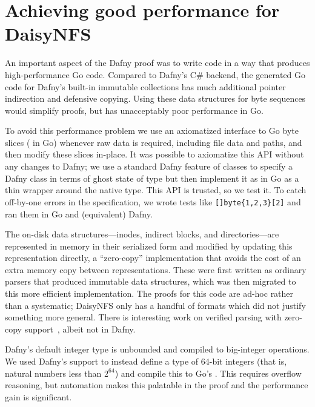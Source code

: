 
\section{Achieving good performance for DaisyNFS}
\label{sec:impl:dafny-perf}

An important aspect of the Dafny proof was to write code in a way that produces
high-performance Go code.
Compared to Dafny's C\# backend, the generated Go code for Dafny's built-in
immutable collections has much
additional pointer indirection and defensive copying. Using these data
structures for byte sequences would simplify proofs, but has unacceptably poor
performance in Go.

To avoid this performance problem we use an axiomatized interface to
Go byte slices ( in Go) whenever raw data is required, including file
data and paths, and then modify these slices in-place. It was possible to
axiomatize this API without any changes to Dafny; we use a standard Dafny
feature of  classes to specify a Dafny class  in terms of
ghost state of type  but then implement it as in Go as a thin
wrapper around the native  type. This API is trusted, so we
test it. To catch off-by-one errors in the specification, we wrote
tests like \verb![]byte{1,2,3}[2]! and ran them in Go and
(equivalent) Dafny.

The on-disk data structures---inodes, indirect blocks, and directories---are
represented in memory in their serialized form and modified by updating this
representation directly, a ``zero-copy'' implementation that avoids the cost of
an extra memory copy between representations. These were first written as
ordinary parsers that produced immutable data structures, which was then
migrated to this more efficient implementation. The proofs for this code are
ad-hoc rather than a systematic; DaisyNFS only has a handful of formats which
did not justify something more general. There is interesting work on
verified parsing with zero-copy support~\cite{swamy:everparse3d}, albeit not in Dafny.

Dafny's default integer type  is unbounded and compiled to big-integer
operations. We used Dafny's
 support to instead define a type of 64-bit integers (that
is, natural numbers less than $2^{64}$) and compile this to Go's .
This requires overflow reasoning, but
automation makes this palatable in the proof and the performance gain is
significant.
